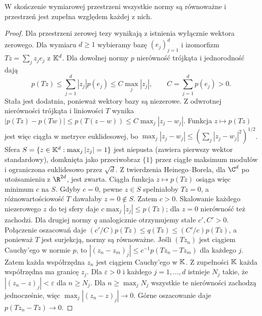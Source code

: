 \begin{twierdzenie}
\label{ma2:thm:finite}
W skończenie wymiarowej przestrzeni wszystkie normy są
równoważne i przestrzeń jest zupełna względem każdej z nich.
\end{twierdzenie}
\begin{proof}
Dla przestrzeni zerowej tezy wynikają z istnienia wyłącznie
wektora zerowego. Dla wymiaru $d\ge1$ wybieramy bazę
$(e_j)_{j=1}^d$ i izomorfizm $Tz=\sum_j z_je_j$ z $\mathbb K^d$.
Dla dowolnej normy $p$ nierówność trójkąta i jednorodność dają
\[
 p(Tz)\le\sum_{j=1}^d |z_j|p(e_j)\le C\max_j|z_j|,
 \qquad C=\sum_{j=1}^d p(e_j)>0.
\]
Stała jest dodatnia, ponieważ wektory bazy są niezerowe.
Z odwrotnej nierówności trójkąta i liniowości $T$ wynika
$|p(Tz)-p(Tw)|\le p(T(z-w))\le C\max_j|z_j-w_j|$.
Funkcja $z\mapsto p(Tz)$ jest więc ciągła w metryce euklidesowej,
bo $\max_j|z_j-w_j|\le(\sum_j|z_j-w_j|^2)^{1/2}$.
Sfera $S=\{z\in\mathbb K^d:\max_j|z_j|=1\}$ jest niepusta
(zawiera pierwszy wektor standardowy), domknięta jako
przeciwobraz $\{1\}$ przez ciągłe maksimum modułów
i ograniczona euklidesowo przez $\sqrt d$.
Z twierdzenia Heinego--Borela, dla $\C^d$ po utożsamieniu
z $\R^{2d}$, jest zwarta. Ciągła funkcja $z\mapsto p(Tz)$
osiąga więc minimum $c$ na $S$. Gdyby $c=0$, pewne
$z\in S$ spełniałoby $Tz=0$, a różnowartościowość $T$
dawałaby $z=0\notin S$. Zatem $c>0$.
Skalowanie każdego niezerowego $z$ do tej sfery daje
$c\max_j|z_j|\le p(Tz)$; dla $z=0$ nierówność też zachodzi.
Dla drugiej normy $q$ analogicznie otrzymujemy stałe $c',C'>0$.
Połączenie oszacowań daje
$(c'/C)p(Tz)\le q(Tz)\le(C'/c)p(Tz)$, a ponieważ $T$
jest surjekcją, normy są równoważne.
Jeśli $(Tz_n)$ jest ciągiem Cauchy'ego w normie $p$, to
$|(z_n-z_m)_j|\le c^{-1}p(Tz_n-Tz_m)$ dla każdego $j$.
Zatem każda współrzędna $z_n$ jest ciągiem Cauchy'ego w $\mathbb K$.
Z zupełności $\mathbb K$ każda współrzędna ma granicę $z_j$.
Dla $\varepsilon>0$ i każdego $j=1,\ldots,d$ istnieje $N_j$
takie, że $|(z_n-z)_j|<\varepsilon$ dla $n\ge N_j$.
Dla $n\ge\max_j N_j$ wszystkie te nierówności zachodzą
jednocześnie, więc $\max_j|(z_n-z)_j|\to0$.
Górne oszacowanie daje $p(Tz_n-Tz)\to0$.
\end{proof}

